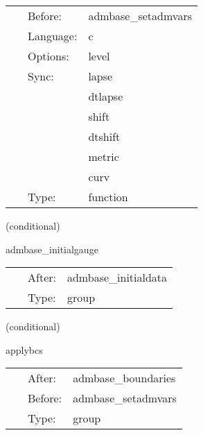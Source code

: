  \begin{tabular*}{160mm}{cll} 
~ & Before:  & admbase\_setadmvars \\ 
~ & Language:  & c \\ 
~ & Options:  & level \\ 
~ & Sync:  & lapse \\ 
~& ~ &dtlapse\\ 
~& ~ &shift\\ 
~& ~ &dtshift\\ 
~& ~ &metric\\ 
~& ~ &curv\\ 
~ & Type:  & function \\ 
\end{tabular*} 


\vspace{5mm}

   (conditional) 

\hspace{5mm} admbase\_initialgauge 

\hspace{5mm}{\it schedule group for the adm initial gauge condition } 


\hspace{5mm}

 \begin{tabular*}{160mm}{cll} 
~ & After:  & admbase\_initialdata \\ 
~ & Type:  & group \\ 
\end{tabular*} 


\vspace{5mm}

   (conditional) 

\hspace{5mm} applybcs 

\hspace{5mm}{\it apply the boundary conditions of admbase } 


\hspace{5mm}

 \begin{tabular*}{160mm}{cll} 
~ & After:  & admbase\_boundaries \\ 
~ & Before:  & admbase\_setadmvars \\ 
~ & Type:  & group \\ 
\end{tabular*} 


\vspace{5mm}

